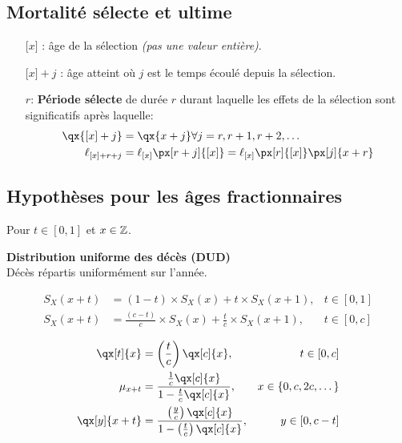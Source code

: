 \documentclass[10pt, french]{article}
\begin{document}
\begin{multicols*}{3}
\begin{itemize}
\end{itemize}


\subsection{Mortalité sélecte et ultime}
\begin{itemize}
\item[${[}x{]}$ : ] âge de la sélection \textit{(pas une valeur entière)}.
\item[${[}x{]} + j$ : ] âge atteint où $j$ est le temps écoulé depuis la sélection.
\item[$r$: ] \textbf{Période sélecte} de durée $r$ durant laquelle les effets de la sélection sont significatifs après laquelle:
\begin{align*}
	\qx{[x] + j} &= \qx{x + j} \forall j = r, r + 1, r + 2, \dots \\
	\ell_{[x] + r + j} &= \ell_{[x]} \px[r + j]{[x]} = \ell_{[x]} \px[r]{[x]} \px[j]{x + r}
\end{align*}
\end{itemize}

\subsection{Hypothèses pour les âges fractionnaires}
Pour $t \in [0,1]$ et $x \in \mathbb{Z}$.

\textbf{Distribution uniforme des décès (DUD)} \\
Décès répartis uniformément sur l'année.

\begin{align*}
S_X(x + t) &= (1 - t) \times S_X(x) + t \times S_X(x + 1),  &t \in [0, 1] \\
S_X(x + t) &= \frac{(c - t)}{c} \times S_X(x) + \frac{t}{c} \times S_X(x + 1),  &t \in [0, c] \\
\end{align*}
\begin{align*}
\qx[t]{x} &= \left(\frac{t}{c}\right) \qx[c]{x},  &t \in [0, c] \\
\mu_{x + t} &= \frac{\frac{1}{c} \qx[c]{x}}{1 - \frac{t}{c} \qx[c]{x}}, &x \in \{0, c, 2c, \dots\} \\
\qx[y]{x + t} &= \frac{\left(\frac{y}{c}\right) \qx[c]{x}}{1 -\left(\frac{t}{c}\right) \qx[c]{x}}, &y \in [0, c - t] 
\end{align*}


\end{multicols*}
\end{document}
